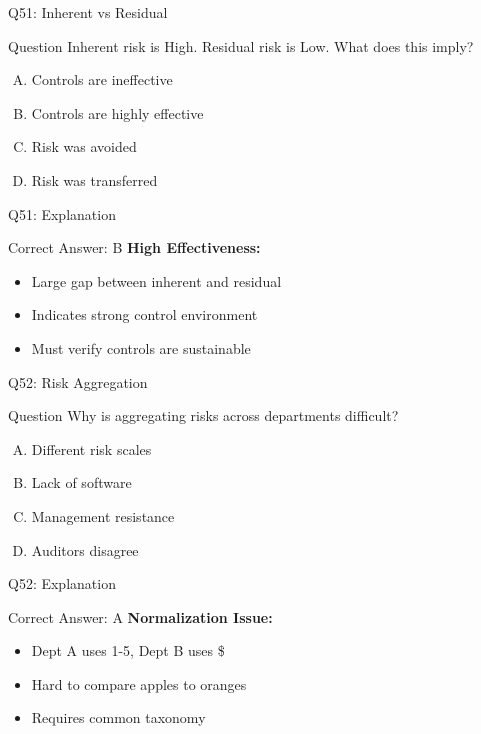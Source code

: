 \documentclass{beamer}
\begin{document}
			\begin{frame}{Q51: Inherent vs Residual}
				\begin{block}{Question}
					Inherent risk is High. Residual risk is Low. What does this imply?
				\end{block}
				\begin{enumerate}[(A)]
					\item Controls are ineffective
					\item Controls are highly effective
					\item Risk was avoided
					\item Risk was transferred
				\end{enumerate}
			\end{frame}
			\begin{frame}{Q51: Explanation}
				\begin{block}{Correct Answer: B}
					\textbf{High Effectiveness:}
					\begin{itemize}
						\item Large gap between inherent and residual
						\item Indicates strong control environment
						\item Must verify controls are sustainable
					\end{itemize}
				\end{block}
			\end{frame}
			
			\begin{frame}{Q52: Risk Aggregation}
				\begin{block}{Question}
					Why is aggregating risks across departments difficult?
				\end{block}
				\begin{enumerate}[(A)]
					\item Different risk scales
					\item Lack of software
					\item Management resistance
					\item Auditors disagree
				\end{enumerate}
			\end{frame}
			\begin{frame}{Q52: Explanation}
				\begin{block}{Correct Answer: A}
					\textbf{Normalization Issue:}
					\begin{itemize}
						\item Dept A uses 1-5, Dept B uses \$
						\item Hard to compare apples to oranges
						\item Requires common taxonomy
					\end{itemize}
				\end{block}
			\end{frame}
			
\end{document}
